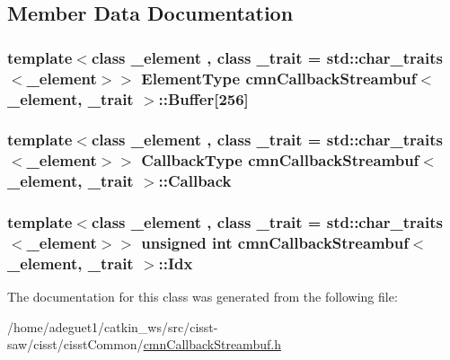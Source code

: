\subsection{Member Data Documentation}
\hypertarget{classcmn_callback_streambuf_ace8ce96c1695f3122b14be13b2129383}{
\subsubsection[{Buffer}]{\setlength{\rightskip}{0pt plus 5cm}template$<$class \-\_\-element , class \-\_\-trait  = std\-::char\-\_\-traits$<$\-\_\-element$>$$>$ {\bf Element\-Type} {\bf cmn\-Callback\-Streambuf}$<$ \-\_\-element, \-\_\-trait $>$\-::Buffer\mbox{[}256\mbox{]}\hspace{0.3cm}{\ttfamily [protected]}}}\label{classcmn_callback_streambuf_ace8ce96c1695f3122b14be13b2129383}
\hypertarget{classcmn_callback_streambuf_a8d35b607ee946b5574313a3f3f19be27}{
\subsubsection[{Callback}]{\setlength{\rightskip}{0pt plus 5cm}template$<$class \-\_\-element , class \-\_\-trait  = std\-::char\-\_\-traits$<$\-\_\-element$>$$>$ {\bf Callback\-Type} {\bf cmn\-Callback\-Streambuf}$<$ \-\_\-element, \-\_\-trait $>$\-::Callback\hspace{0.3cm}{\ttfamily [protected]}}}\label{classcmn_callback_streambuf_a8d35b607ee946b5574313a3f3f19be27}
\hypertarget{classcmn_callback_streambuf_a27d747a886699be88098955251af1159}{
\subsubsection[{Idx}]{\setlength{\rightskip}{0pt plus 5cm}template$<$class \-\_\-element , class \-\_\-trait  = std\-::char\-\_\-traits$<$\-\_\-element$>$$>$ unsigned int {\bf cmn\-Callback\-Streambuf}$<$ \-\_\-element, \-\_\-trait $>$\-::Idx\hspace{0.3cm}{\ttfamily [protected]}}}\label{classcmn_callback_streambuf_a27d747a886699be88098955251af1159}


The documentation for this class was generated from the following file\-:\begin{DoxyCompactItemize}
\item 
/home/adeguet1/catkin\-\_\-ws/src/cisst-\/saw/cisst/cisst\-Common/\hyperlink{cmn_callback_streambuf_8h}{cmn\-Callback\-Streambuf.\-h}\end{DoxyCompactItemize}
